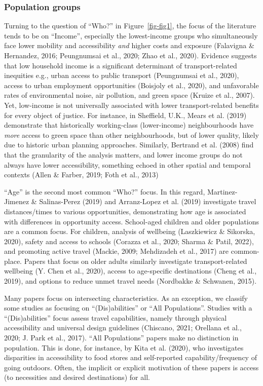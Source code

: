 \documentclass[
  letterpaper,
  DIV=11,
  numbers=noendperiod]{scrartcl}
\begin{document}
\subsubsection{Population groups}\label{population-groups}

Turning to the question of ``Who?'' in Figure~\ref{fig-fig1}, the focus
of the literature tends to be on ``Income'', especially the
lowest-income groups who simultaneously face lower mobility and
accessibility \emph{and} higher costs and exposure (Falavigna \&
Hernandez, 2016; Peungnumsai et al., 2020; Zhao et al., 2020). Evidence
suggests that low household income is a significant determinant of
transport-related inequities e.g., urban access to public transport
(Peungnumsai et al., 2020), access to urban employment opportunities
(Boisjoly et al., 2020), and unfavorable rates of environmental noise,
air pollution, and green space (Kruize et al., 2007). Yet, low-income is
not universally associated with lower transport-related benefits for
every object of justice. For instance, in Sheffield, U.K., Mears et al.
(2019) demonstrate that historically working-class (lower-income)
neighbourhoods have \emph{more} access to green space than other
neighbourhoods, but of lower quality, likely due to historic urban
planning approaches. Similarly, Bertrand et al. (2008) find that the
granularity of the analysis matters, and lower income groups do not
always have lower accessibility, something echoed in other spatial and
temporal contexts (Allen \& Farber, 2019; Foth et al., 2013)

``Age'' is the second most common ``Who?'' focus. In this regard,
Martinez-Jimenez \& Salinas-Perez (2019) and Arranz-Lopez et al. (2019)
investigate travel distances/times to various opportunities,
demonstrating how age is associated with differences in opportunity
access. School-aged children and older populations are a common focus.
For children, analysis of wellbeing (Laszkiewicz \& Sikorska, 2020),
safety and access to schools (Corazza et al., 2020; Sharma \& Patil,
2022), and promoting active travel (Mackie, 2009; Mehdizadeh et al.,
2017) are common-place. Papers that focus on older adults similarly
investigate transport-related wellbeing (Y. Chen et al., 2020), access
to age-specific destinations (Cheng et al., 2019), and options to reduce
unmet travel needs (Nordbakke \& Schwanen, 2015).

Many papers focus on intersecting characteristics. As an exception, we
classify some studies as focusing on ``(Dis)abilities'' or ``All
Populations''. Studies with a ``(Dis)abilities'' focus assess travel
capabilities, namely through physical accessibility and universal design
guidelines (Chiscano, 2021; Orellana et al., 2020; J. Park et al.,
2017). ``All Populations'' papers make no distinction in population.
This is done, for instance, by Kita et al. (2020), who investigates
disparities in accessibility to food stores and self-reported
capability/frequency of going outdoors. Often, the implicit or explicit
motivation of these papers is access (to necessities and desired
destinations) for all.
\end{document}
